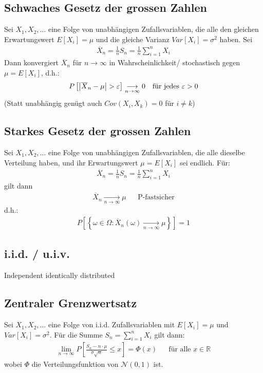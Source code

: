 \documentclass[8pt]{extarticle}
\newcommand{\R}{\mathbb{R}}
\newcommand{\ra}{\rightarrow}
\newcommand{\Sn}{\sum_{i = 1}^n}
\newcommand{\Standardnormalverteilt}{\mathcal{N}  (0, 1)}
\begin{document}
\begin{multicols*}{3}
  \subsection*{Schwaches Gesetz der grossen Zahlen}
  Sei $X_1, X_2, \dots$ eine Folge von unabhängigen Zufallsvariablen, die alle
  den gleichen Erwartungswert $E[X_i] = \mu$ und die gleiche Varianz $Var[X_i] =
    \sigma^2$ haben. Sei
  \begin{align*}
    \overline{X}_n = \frac{1}{n} S_n = \frac{1}{n} \Sn X_i
  \end{align*}
  Dann konvergiert $\overline{X}_n$ für $n \ra \infty$ in Wahrscheinlichkeit/
  stochastisch gegen $\mu = E[X_i]$, d.h.:
  \begin{align*}
    P \left[ \abs{\overline{X}_n - \mu} > \varepsilon \right] \underset{n \ra \infty}{\longrightarrow} 0
     &  & \text{für jedes } \varepsilon > 0
  \end{align*}
   (Statt unabhängig genügt auch $Cov (X_i, X_k) = 0$ für $i \neq k$)
  \subsection*{Starkes Gesetz der grossen Zahlen}
  Sei $X_1, X_2, \dots$ eine Folge von unabhängigen Zufallsvariablen, die alle
  dieselbe Verteilung haben, und ihr Erwartungswert $\mu = E[X_i]$ sei endlich.
  Für:
  \begin{align*}
    \overline{X}_n = \frac{1}{n} S_n = \frac{1}{n} \Sn X_i
  \end{align*}
  gilt dann
  \begin{align*}
    \overline{X}_n \underset{n \ra \infty}{\longrightarrow} \mu &  & \text{P-fastsicher}
  \end{align*}
  d.h.:
  \begin{align*}
    P \left[ \left\{ \omega \in \Omega : \overline{X}_n (\omega) \underset{n \ra \infty}{\longrightarrow} \mu \right\} \right] = 1
  \end{align*}
  \subsection*{i.i.d. / u.i.v.}
  Independent identically distributed
  \subsection*{Zentraler Grenzwertsatz}
  Sei $X_1, X_2, \dots$ eine Folge von i.i.d. Zufallsvariablen mit $E[X_i] = \mu$
  und $Var[X_i] = \sigma^2$. Für die Summe $S_n = \Sn X_i$ gilt dann:
  \begin{align*}
    \lim_{n \ra \infty} P \left[ \frac{S_n - n \cdot \mu}{\sigma \sqrt{n}} \leq x \right] = \Phi (x)
     &  & \text{für alle } x \in \R
  \end{align*}
  wobei $\Phi$ die Verteilungsfunktion von $\Standardnormalverteilt$ ist.

\end{multicols*}
\end{document}
